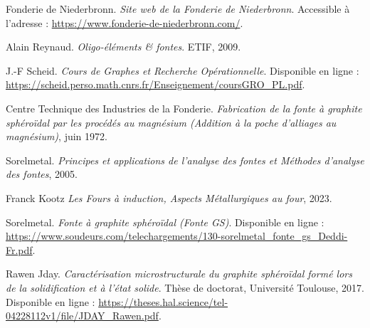 \documentclass[12pt]{article}
\begin{document}
\begin{thebibliography}{9}

Fonderie de Niederbronn. \emph{Site web de la Fonderie de Niederbronn}. Accessible à l'adresse : \url{https://www.fonderie-de-niederbronn.com/}.

Alain Reynaud. \emph{Oligo-éléments \& fontes}. ETIF, 2009.

J.-F Scheid. \emph{Cours de Graphes et Recherche Opérationnelle}. Disponible en ligne : \url{https://scheid.perso.math.cnrs.fr/Enseignement/coursGRO_PL.pdf}.

Centre Technique des Industries de la Fonderie. \emph{Fabrication de la fonte à graphite sphéroïdal par les procédés au magnésium (Addition à la poche d'alliages au magnésium)}, juin 1972.

Sorelmetal. \emph{Principes et applications de l'analyse des fontes et Méthodes d'analyse des fontes}, 2005.


Franck Kootz \emph{Les Fours à induction, Aspects Métallurgiques au four}, 2023.


Sorelmetal. \emph{Fonte à graphite sphéroïdal (Fonte GS)}. Disponible en ligne : \url{https://www.soudeurs.com/telechargements/130-sorelmetal_fonte_gs_Deddi-Fr.pdf}.


Rawen Jday. \emph{Caractérisation microstructurale du graphite sphéroïdal formé lors de la
solidification et à l'état solide}. Thèse de doctorat, Université Toulouse, 2017. Disponible en ligne : \url{https://theses.hal.science/tel-04228112v1/file/JDAY_Rawen.pdf}.

\end{thebibliography}
\end{document}
